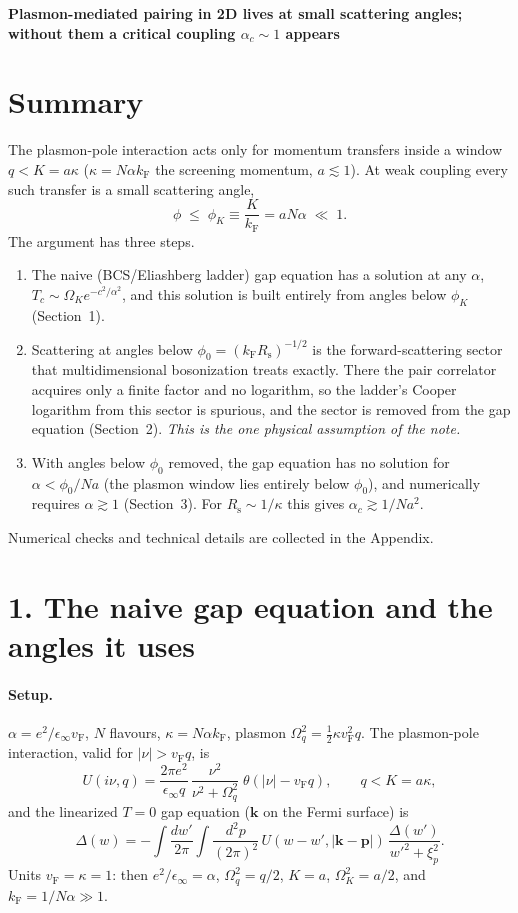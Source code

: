 \documentclass[11pt]{article}
\newcommand{\kF}{k_{\mathrm F}}
\newcommand{\vF}{v_{\mathrm F}}
\newcommand{\einf}{\epsilon_\infty}
\newcommand{\OK}{\Omega_K}
\newcommand{\Rs}{R_{\mathrm s}}
\begin{document}
\sloppy
\begin{center}\large\textbf{Plasmon-mediated pairing in 2D lives at small scattering angles;\\
without them a critical coupling $\alpha_c\sim1$ appears}\end{center}

\section*{Summary}
The plasmon-pole interaction acts only for momentum transfers inside a window $q<K=a\kappa$
($\kappa=N\alpha\kF$ the screening momentum, $a\lesssim1$). At weak coupling every such
transfer is a small scattering angle,
\[
\phi\;\le\;\phi_K\equiv\frac{K}{\kF}=aN\alpha\;\ll\;1 .
\]
The argument has three steps.
\begin{enumerate}
\item The naive (BCS/Eliashberg ladder) gap equation has a solution at any $\alpha$,
$T_c\sim\OK e^{-c^2/\alpha^2}$, and this solution is built entirely from angles below
$\phi_K$ (Section~1).
\item Scattering at angles below $\phi_0=(\kF\Rs)^{-1/2}$ is the forward-scattering sector
that multidimensional bosonization treats exactly. There the pair correlator acquires only a
finite factor and no logarithm, so the ladder's Cooper logarithm from this sector is
spurious, and the sector is removed from the gap equation (Section~2). \emph{This is the
one physical assumption of the note.}
\item With angles below $\phi_0$ removed, the gap equation has no solution for
$\alpha<\phi_0/Na$ (the plasmon window lies entirely below $\phi_0$), and numerically
requires $\alpha\gtrsim1$ (Section~3). For $\Rs\sim1/\kappa$ this gives
$\alpha_c\gtrsim1/Na^2$.
\end{enumerate}
Numerical checks and technical details are collected in the Appendix.

\section*{1. The naive gap equation and the angles it uses}

\paragraph{Setup.}
$\alpha=e^2/\einf\vF$, $N$ flavours, $\kappa=N\alpha\kF$, plasmon
$\Omega_q^2=\tfrac12\kappa\vF^2q$. The plasmon-pole interaction, valid for $|\nu|>\vF q$, is
\begin{equation}
U(i\nu,q)=\frac{2\pi e^2}{\einf q}\,\frac{\nu^2}{\nu^2+\Omega_q^2}\;\theta(|\nu|-\vF q),
\qquad q<K=a\kappa ,
\label{eq:U}
\end{equation}
and the linearized $T=0$ gap equation ($\mathbf k$ on the Fermi surface) is
\begin{equation}
\Delta(w)=-\int\!\frac{dw'}{2\pi}\int\!\frac{d^2p}{(2\pi)^2}\,
U(w-w',|\mathbf k-\mathbf p|)\,\frac{\Delta(w')}{w'^2+\xi_p^2}.
\label{eq:gap}
\end{equation}
Units $\vF=\kappa=1$: then $e^2/\einf=\alpha$, $\Omega_q^2=q/2$, $K=a$, $\OK^2=a/2$, and
$\kF=1/N\alpha\gg1$.
\end{document}
